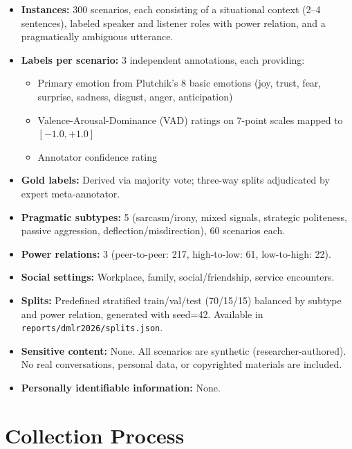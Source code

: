 \documentclass[11pt]{article}
\begin{document}
\begin{itemize}[leftmargin=*]
    \item \textbf{Instances:} 300 scenarios, each consisting of a situational context (2--4 sentences), labeled speaker and listener roles with power relation, and a pragmatically ambiguous utterance.
    \item \textbf{Labels per scenario:} 3 independent annotations, each providing:
    \begin{itemize}
        \item Primary emotion from Plutchik's 8 basic emotions (joy, trust, fear, surprise, sadness, disgust, anger, anticipation)
        \item Valence-Arousal-Dominance (VAD) ratings on 7-point scales mapped to $[-1.0, +1.0]$
        \item Annotator confidence rating
    \end{itemize}
    \item \textbf{Gold labels:} Derived via majority vote; three-way splits adjudicated by expert meta-annotator.
    \item \textbf{Pragmatic subtypes:} 5 (sarcasm/irony, mixed signals, strategic politeness, passive aggression, deflection/misdirection), 60 scenarios each.
    \item \textbf{Power relations:} 3 (peer-to-peer: 217, high-to-low: 61, low-to-high: 22).
    \item \textbf{Social settings:} Workplace, family, social/friendship, service encounters.
    \item \textbf{Splits:} Predefined stratified train/val/test (70/15/15) balanced by subtype and power relation, generated with seed=42. Available in \texttt{reports/dmlr2026/splits.json}.
    \item \textbf{Sensitive content:} None. All scenarios are synthetic (researcher-authored). No real conversations, personal data, or copyrighted materials are included.
    \item \textbf{Personally identifiable information:} None.
\end{itemize}

\section{Collection Process}
\end{document}
